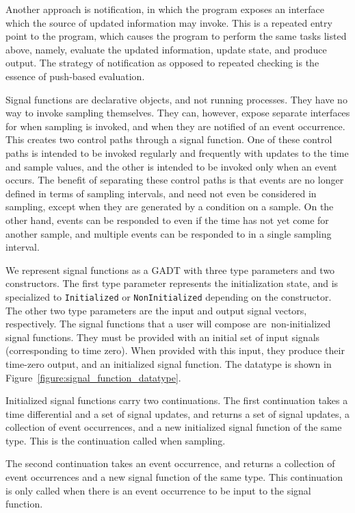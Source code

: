 Another approach is notification, in which the program exposes an interface
which the source of updated information may invoke. This is a repeated entry
point to the program, which causes the program to perform the same tasks
listed above, namely, evaluate the updated information, update state, and
produce output. The strategy of notification as opposed to repeated checking is
the essence of push-based evaluation.

Signal functions are declarative objects, and not running processes. They have
no way to invoke sampling themselves. They can, however, expose separate
interfaces for when sampling is invoked, and when they are notified of an event
occurrence. This creates two control paths through a signal function. One of
these control paths is intended to be invoked regularly and frequently with
updates to the time and sample values, and the other is intended to be invoked
only when an event occurs. The benefit of separating these control paths is that
events are no longer defined in terms of sampling intervals, and need not even
be considered in sampling, except when they are generated by a condition on a
sample. On the other hand, events can be responded to even if the time has not
yet come for another sample, and multiple events can be responded to in a single
sampling interval.

We represent signal functions as a GADT with three type parameters and two 
constructors. The first type parameter represents the initialization state,
and is specialized to {\tt Initialized} or {\tt NonInitialized} depending on the
constructor. The other two type parameters are the input and output signal
vectors, respectively. The signal functions that a user will compose are\
non-initialized signal functions. They must be provided with an initial set of
input signals (corresponding to time zero). When provided with this input, they
produce their time-zero output, and an initialized signal function. The datatype
is shown in Figure~\ref{figure:signal_function_datatype}.

Initialized signal functions carry two continuations. The first continuation
takes a time differential and a set of signal updates, and returns a set of
signal updates, a collection of event occurrences, and a new initialized signal
function of the same type. This is the continuation called when sampling.

The second continuation takes an event occurrence, and returns a collection of
event occurrences and a new signal function of the same type. This continuation
is only called when there is an event occurrence to be input to the signal
function.

